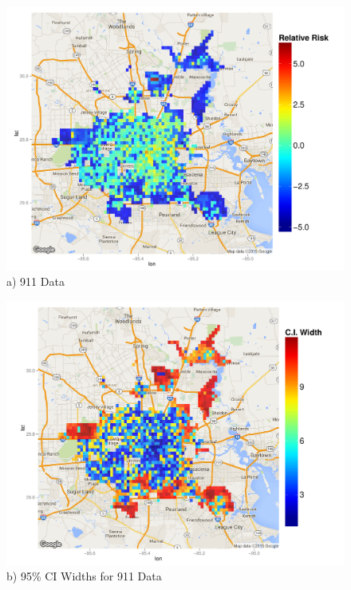 \documentclass[final]{statsoc}
\begin{document}
\begin{figure}
  \begin{minipage}[t]{0.48\textwidth}
    \centering
    \includegraphics[width=1.0\textwidth]{./imgs/911calls_rr.pdf}
    \\
    a) 911 Data
    \\
  \end{minipage}
  \hfill
  \begin{minipage}[t]{0.48\textwidth}
    \centering
    \includegraphics[width=1.0\textwidth]{imgs/911calls_ciwidths.pdf}
    \\
    b) 95\% CI Widths for 911 Data
    \\

\end{minipage}
\end{figure}
\end{document}
